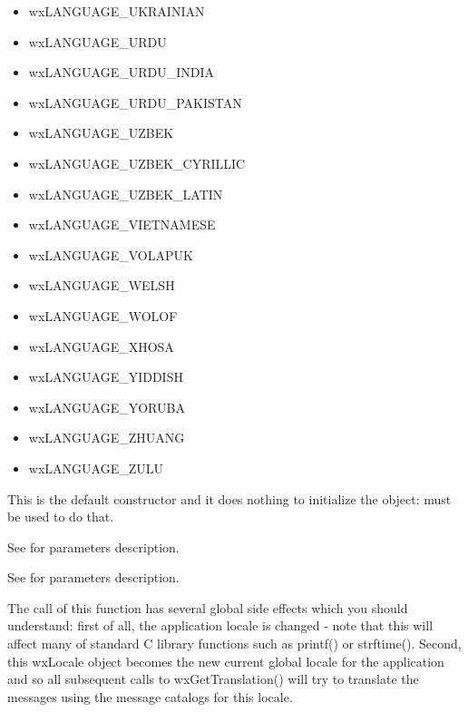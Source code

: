 \begin{itemize}
\item wxLANGUAGE\_UKRAINIAN
\item wxLANGUAGE\_URDU
\item wxLANGUAGE\_URDU\_INDIA
\item wxLANGUAGE\_URDU\_PAKISTAN
\item wxLANGUAGE\_UZBEK
\item wxLANGUAGE\_UZBEK\_CYRILLIC
\item wxLANGUAGE\_UZBEK\_LATIN
\item wxLANGUAGE\_VIETNAMESE
\item wxLANGUAGE\_VOLAPUK
\item wxLANGUAGE\_WELSH
\item wxLANGUAGE\_WOLOF
\item wxLANGUAGE\_XHOSA
\item wxLANGUAGE\_YIDDISH
\item wxLANGUAGE\_YORUBA
\item wxLANGUAGE\_ZHUANG
\item wxLANGUAGE\_ZULU
\end{itemize}





\label{wxlocaledefctor}


This is the default constructor and it does nothing to initialize the object: 
 must be used to do that.


See  for parameters description.


See  for parameters description.

The call of this function has several global side effects which you should
understand: first of all, the application locale is changed - note that this
will affect many of standard C library functions such as printf() or strftime().
Second, this wxLocale object becomes the new current global locale for the
application and so all subsequent calls to wxGetTranslation() will try to
translate the messages using the message catalogs for this locale.


